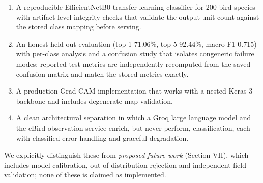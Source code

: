 \documentclass[conference]{IEEEtran}
\begin{document}
\begin{enumerate}
\item A reproducible EfficientNetB0 transfer-learning classifier for 200 bird species with artifact-level integrity checks that validate the output-unit count against the stored class mapping before serving.
\item An honest held-out evaluation (top-1 71.06\%, top-5 92.44\%, macro-F1 0.715) with per-class analysis and a confusion study that isolates congeneric failure modes; reported test metrics are independently recomputed from the saved confusion matrix and match the stored metrics exactly.
\item A production Grad-CAM implementation that works with a nested Keras 3 backbone and includes degenerate-map validation.
\item A clean architectural separation in which a Groq large language model and the eBird observation service enrich, but never perform, classification, each with classified error handling and graceful degradation.
\end{enumerate}
We explicitly distinguish these from \textit{proposed future work} (Section VII), which includes model calibration, out-of-distribution rejection and independent field validation; none of these is claimed as implemented.
\end{document}
